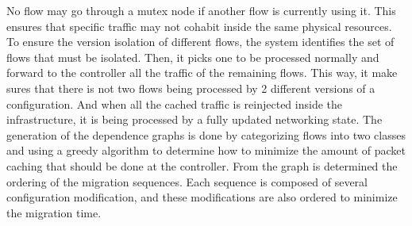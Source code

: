 No flow may go through a mutex node if another flow is currently using it.
This ensures that specific traffic may not cohabit inside the same physical resources.
To ensure the version isolation of different flows, the system identifies the set of flows that must be isolated. Then, it picks one to be processed normally and forward to the controller all the traffic of the remaining flows. This way, it make sures that there is not two flows being processed by 2 different versions of a configuration. And when all the cached traffic is reinjected inside the infrastructure, it is being processed by a fully updated networking state.
The generation of the dependence graphs is done by categorizing flows into two classes and using a greedy algorithm to determine how to minimize the amount of packet caching that should be done at the controller.
From the graph is determined the ordering of the migration sequences. Each sequence is composed of several configuration modification, and these modifications are also ordered to minimize the migration time. 

